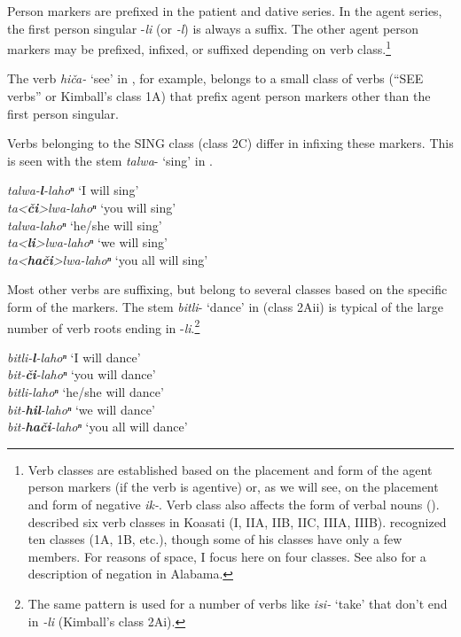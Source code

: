 \documentclass[output=paper,colorlinks,citecolor=brown]{langscibook}
\begin{document}
\newpage
Person markers are prefixed in the patient and dative series. In the agent series, the first person singular -\textit{li} (or \textit{-l}) is always a suffix. The other agent person markers may be prefixed, infixed, or suffixed depending on verb class.\footnote{Verb classes are established based on the placement and form of the agent person markers (if the verb is agentive) or, as we will see, on the placement and form of negative \textit{ik-}. Verb class also affects the form of verbal nouns (\citealt[273ff]{Kimball1991}). \citet{Haas1946} described six verb classes in Koasati (I, IIA, IIB, IIC, IIIA, IIIB). \citet{Kimball1991,Kimball1994} recognized ten classes (1A, 1B, etc.), though some of his classes have only a few members. For reasons of space, I focus here on four classes. See also \citet{MontlerHardy1991} for a description of negation in Alabama.}

The verb \textit{hiča-} ‘see’ in , for example, belongs to a small class of verbs (“SEE verbs” or Kimball’s class 1A) that prefix agent person markers other than the first person singular.

Verbs belonging to the SING class (class 2C) differ in infixing these markers. This is seen with the stem \textit{talwa}- ‘sing’ in .

\ea\label{ex:koa:5} 
    \textit{talwa-\textbf{l}-lahoⁿ} \tab ‘I will sing’ \\
    \textit{ta<\textbf{či}>lwa-lahoⁿ} \tab ‘you will sing’ \\
    \textit{talwa-lahoⁿ} \tab ‘he/she will sing’ \\
    \textit{ta<\textbf{li}>lwa-lahoⁿ} \tab ‘we will sing’ \\
    \textit{ta<\textbf{hači}>lwa-lahoⁿ} \tab ‘you all will sing’ \\
\z

Most other verbs are suffixing, but belong to several classes based on the specific form of the markers. The stem \textit{bitli}- ‘dance’ in  (class 2Aii) is typical of the large number of verb roots ending in -\textit{li}.\footnote{The same pattern is used for a number of verbs like \textit{isi-} ‘take’ that don’t end in \textit{{}-li} (Kimball’s class 2Ai).}

\ea\label{ex:koa:6} 
    \textit{bitli-\textbf{l}-lahoⁿ} \tab ‘I will dance’ \\
    \textit{bit-\textbf{či}-lahoⁿ} \tab ‘you will dance’ \\
    \textit{bitli-lahoⁿ} \tab ‘he/she will dance’ \\
    \textit{bit-\textbf{hil}-lahoⁿ} \tab ‘we will dance’ \\
    \textit{bit-\textbf{hači}-lahoⁿ} \tab ‘you all will dance’ \\
\z
\end{document}
